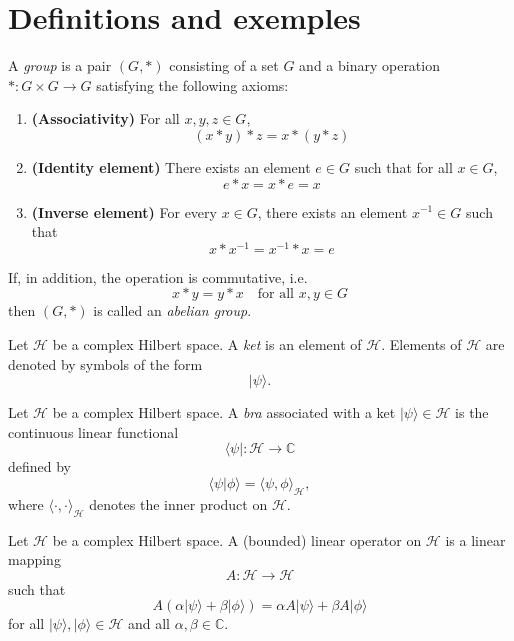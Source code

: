\documentclass{article}
\begin{document}
\section{\textbf{Definitions and exemples}}
\vspace{0.5cm}
\begin{definition}[Group]
    A \emph{group} is a pair $(G, \ast)$ consisting of a set $G$ and a binary operation 
    $\ast : G \times G \to G$ satisfying the following axioms:
    
    \begin{enumerate}
        \item \textbf{(Associativity)} 
        For all $x,y,z \in G$,
        $$ (x \ast y) \ast z = x \ast (y \ast z) $$
        
        \item \textbf{(Identity element)} 
        There exists an element $e \in G$ such that for all $x \in G$,
        $$ e \ast x = x \ast e = x $$
        
        \item \textbf{(Inverse element)} 
        For every $x \in G$, there exists an element $x^{-1} \in G$ such that
        $$ x \ast x^{-1} = x^{-1} \ast x = e $$
    \end{enumerate}
    
    If, in addition, the operation is commutative, i.e.
    $$ x \ast y = y \ast x \quad \text{for all } x,y \in G $$
    then $(G,\ast)$ is called an \emph{abelian group}.
\end{definition}

\begin{definition}[Ket]
	Let $\mathcal{H}$ be a complex Hilbert space.
	A \emph{ket} is an element of $\mathcal{H}$.
	Elements of $\mathcal{H}$ are denoted by symbols of the form
	$$
	|\psi\rangle .
	$$
\end{definition}

\begin{definition}[Bra]
	Let $\mathcal{H}$ be a complex Hilbert space.
	A \emph{bra} associated with a ket $|\psi\rangle \in \mathcal{H}$
	is the continuous linear functional
	$$
	\langle \psi| : \mathcal{H} \to \mathbb{C}
	$$
	defined by
	$$
	\langle \psi| \phi\rangle = \langle \psi, \phi\rangle_{\mathcal{H}},
	$$
	where $\langle \cdot , \cdot \rangle_{\mathcal{H}}$ denotes the inner product on $\mathcal{H}$.
\end{definition}

\begin{definition}
	Let $\mathcal{H}$ be a complex Hilbert space.
	A (bounded) linear operator on $\mathcal{H}$ is a linear mapping
	$$
	A : \mathcal{H} \to \mathcal{H}
	$$
	such that
	$$
	A(\alpha |\psi\rangle + \beta |\phi\rangle)
	=
	\alpha A|\psi\rangle + \beta A|\phi\rangle
	$$
	for all $|\psi\rangle, |\phi\rangle \in \mathcal{H}$
	and all $\alpha, \beta \in \mathbb{C}$.
\end{definition}
\end{document}
